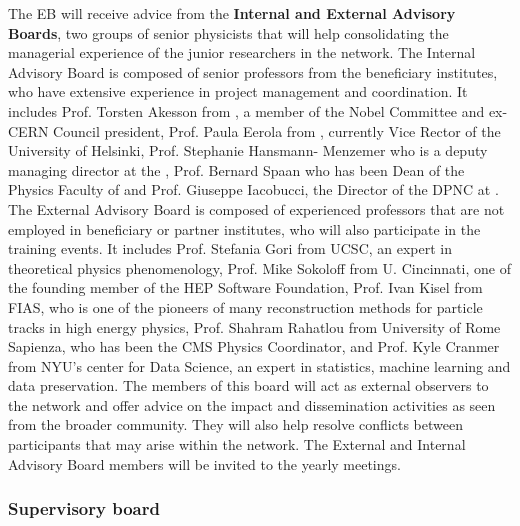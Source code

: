 The EB will receive advice from the \textbf{Internal and External Advisory Boards}, two groups of senior physicists that will help consolidating the managerial experience of the junior researchers in the network. 
The Internal Advisory Board is composed of senior professors from the beneficiary institutes, who have extensive experience in project management and coordination. 
It includes Prof. Torsten Akesson from \lund, a member of the Nobel Committee and ex-CERN Council president, Prof. Paula Eerola from \helsinki, currently Vice Rector of the University of Helsinki, Prof. Stephanie Hansmann- Menzemer who is a deputy managing director at the \heidelberg, Prof. Bernard Spaan who has been Dean of the Physics Faculty of \dortmund and Prof. Giuseppe Iacobucci, the Director of the DPNC at \unigeshort. 
The External Advisory Board is composed of experienced professors that are not employed in beneficiary or partner institutes, who will also participate in the training events. 
It includes Prof. Stefania Gori from UCSC, an expert in theoretical physics phenomenology, Prof. Mike Sokoloff from U. Cincinnati, one of the founding member of the HEP Software Foundation, Prof. Ivan Kisel from FIAS, who is one of the pioneers of many reconstruction methods for particle tracks in high energy physics, Prof. Shahram Rahatlou from University of Rome Sapienza, who has been the CMS Physics Coordinator, and Prof. Kyle Cranmer from NYU's center for Data Science, an expert in statistics, machine learning and data preservation. 
The members of this board will act as external observers to the network and offer advice on the impact and dissemination activities as seen from the broader community. 
They will also help resolve conflicts between participants that may arise within the network.
The External and Internal Advisory Board members will be invited to the \acronym yearly meetings. 

\vspace{-2mm}
\subsubsection{Supervisory board}


